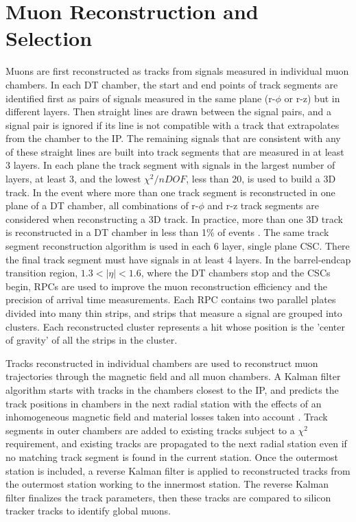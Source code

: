 \section{Muon Reconstruction and Selection}
\label{sec:muReco}

Muons are first reconstructed as tracks from signals measured in individual muon chambers.  In each DT chamber, the start and end points of 
track segments are identified first as pairs of signals measured in the same plane (r-$\phi$ or r-z) but in different layers.  Then straight 
lines are drawn between the signal pairs, and a signal pair is ignored if its line is not compatible with a track that extrapolates from 
the chamber to the IP.  The remaining signals that are consistent with any of these straight lines are built into track segments that are 
measured in at least 3 layers.  In each plane the track segment with signals in the largest number of layers, at least 3, and the lowest 
$\chi^{2}/nDOF$, less than 20, is used to build a 3D track.  In the event where more than one track segment is reconstructed 
in one plane of a DT chamber, all combinations of r-$\phi$ and r-z track segments are considered when reconstructing a 3D track.  In 
practice, more than one 3D track is reconstructed in a DT chamber in less than 1\% of events \cite{cmsTdrPhysPerformance}.  The same 
track segment reconstruction algorithm is used in each 6 layer, single plane CSC.  There the final track segment must have signals 
in at least 4 layers.  In the barrel-endcap transition region, $1.3 < |\eta| < 1.6$, where the DT chambers stop and the CSCs begin, RPCs 
are used to improve the muon reconstruction efficiency and the precision of arrival time measurements.  Each RPC contains two parallel 
plates divided into many thin strips, and strips that measure a signal are grouped into clusters.  Each reconstructed cluster represents 
a hit whose position is the 'center of gravity' of all the strips in the cluster.

Tracks reconstructed in individual chambers are used to reconstruct muon trajectories through the magnetic field and all muon chambers.  
A Kalman filter algorithm starts with tracks in the chambers closest to the IP, and predicts the track positions in chambers in the next 
radial station with the effects of an inhomogeneous magnetic field and material losses taken into account \cite{muonRecoFirstCollisions}.  
Track segments in outer chambers are added to existing tracks subject to a $\chi^{2}$ requirement, and existing tracks are propagated to 
the next radial station even if no matching track segment is found in the current station.  Once the outermost station is included, a 
reverse Kalman filter is applied to reconstructed tracks from the outermost station working to the innermost station.  The reverse Kalman 
filter finalizes the track parameters, then these tracks are compared to silicon tracker tracks to identify global muons.

